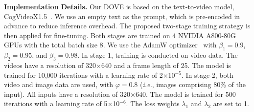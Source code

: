 \documentclass{article}
\newcommand\ie{\textit{i.e.}}
\begin{document}
\noindent \textbf{Implementation Details.}
Our DOVE is based on the text-to-video model, CogVideoX1.5~\cite{yang2024cogvideox}. We use an empty text as the prompt, which is pre-encoded in advance to reduce inference overhead. The proposed two-stage training strategy is then applied for fine-tuning. Both stages are trained on 4 NVIDIA A800-80G GPUs with the total batch size 8. We use the AdamW optimizer~\cite{loshchilov2017fixing} with ${\beta}_1$$=$$0.9$, ${\beta}_2$$=$$0.95$, and ${\beta}_3$$=$$0.98$. In stage-1, training is conducted on video data. The videos have a resolution of 320$\times$640 and a frame length of 25. The model is trained for 10,000 iterations with a learning rate of 2$\times$10$^{-5}$. In stage-2, both video and image data are used, with $\varphi$$=$0.8 (\ie, images comprising 80\% of the input). All inputs have a resolution of 320$\times$640. The model is trained for 500 iterations with a learning rate of 5$\times$10$^{-6}$. The loss weights $\lambda_1$ and $\lambda_2$ are set to 1.
\end{document}
